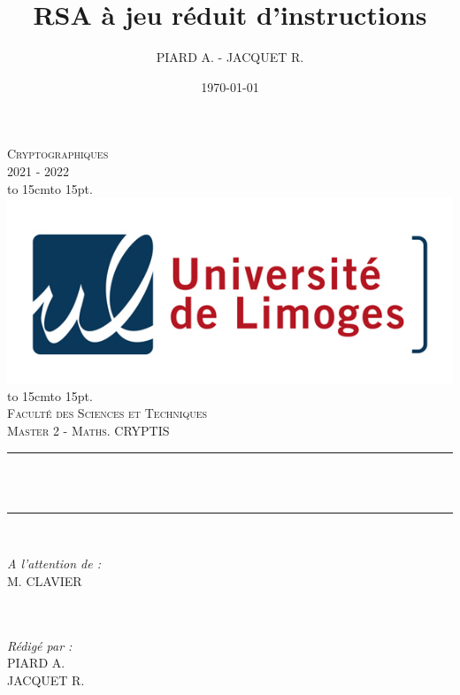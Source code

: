 \documentclass[12pt]{article}
\title{RSA à jeu réduit d'instructions}
\author{PIARD A. - JACQUET R.}
\date{\today}
\makeatletter
\let\thetitle\@title
\def\dotfill#1{\cleaders\hbox to #1{.}\hfill}
\newcommand\dotline[2][.5em]{\leavevmode\hbox to #2{\dotfill{#1}\hfil}}
\theoremstyle{remark}\newtheorem{note}{Note}
\theoremstyle{remark}\newtheorem{nota}{Notation}
\theoremstyle{definition}
\makeatother
\begin{document}

\begin{titlepage}
	\centering
    \vspace*{0.7 cm}
    \textsc{\LARGE {}
     Cryptographiques\\ \vspace{0.2cm} 2021 - 2022}\\[1.0 cm]
    \dotline[15pt]{15cm}\\
	\includegraphics[scale = 2.2]{logo.png}
	\dotline[15pt]{15cm}\\
	\vspace{1.5cm}
	\textsc{\Large Faculté des Sciences et Techniques}\\
	\textsc{\large Master 2 - Maths. CRYPTIS}\\[1.0 cm]
	\rule{\linewidth}{0.2 mm} \\[0.4 cm]
	{ \huge \bfseries \color{blue} \thetitle}\\
	\rule{\linewidth}{0.2 mm} \\[1.5 cm]
	
	\begin{minipage}{0.4\textwidth}
		\begin{flushleft} \large
			\emph{A l'attention de :}\\
			M. CLAVIER\\
			\phantom{a}\\
			\phantom{a}\\
		\end{flushleft}
	\end{minipage}
	\begin{minipage}{0.5\textwidth}
    	\begin{flushright} \large
		\emph{Rédigé par :}\\
		PIARD A.\\
		JACQUET R.\\
		\end{flushright}
	\end{minipage}\\[2 cm]
\end{titlepage}
\end{document}
